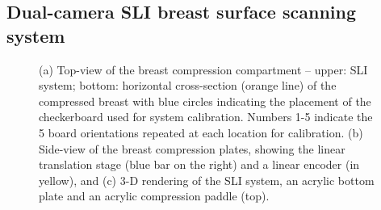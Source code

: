 \subsection{Dual-camera SLI breast surface scanning system}
\label{sec:sli}
\begin{figure}
	\begin{center}
	\end{center}
	\caption{ (a) Top-view of the breast compression compartment -- upper: \ac{SLI} system; bottom: horizontal cross-section (orange line) of the compressed breast with blue circles indicating the placement of the checkerboard used for system calibration. Numbers 1-5 indicate the 5 board orientations repeated at each location for calibration. (b) Side-view of the breast compression plates, showing the linear translation stage (blue bar on the right) and a linear encoder (in yellow), and  (c) 3-D rendering of the \ac{SLI} system, an acrylic bottom plate and an acrylic compression paddle (top). } 
	\label{fig:mammographysetup}
\end{figure} 
